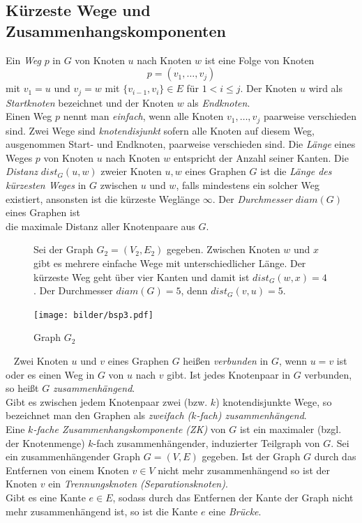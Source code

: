 \subsection{Kürzeste Wege und Zusammenhangskomponenten}
Ein \emph{Weg} $p$ in $G$ von Knoten $u$ nach Knoten $w$ ist eine Folge von Knoten $$p=(v_1,\ldots,v_j)$$ mit $v_1=u$ und $v_j=w$ mit $\{v_{i-1},v_i\}\in E$ für $1 <i \leq j$. Der Knoten $u$ wird als \emph{Startknoten} bezeichnet und der Knoten $w$ als \emph{Endknoten}.\\Einen Weg $p$ nennt man \emph{einfach}, wenn alle Knoten $v_1,\ldots,v_j$ paarweise verschieden sind. Zwei Wege sind \emph{knotendisjunkt} sofern alle Knoten auf diesem Weg, ausgenommen Start- und Endknoten, paarweise verschieden sind. Die \emph{Länge} eines Weges $p$ von Knoten $u$ nach Knoten $w$ entspricht der Anzahl seiner Kanten.\vspace{-1mm}\newline\newline
Die \emph{Distanz} $dist_G(u,w)$ zweier Knoten $u,w$ eines Graphen $G$ ist die \emph{Länge des kürzesten Weges} in $G$ zwischen $u$ und $w$, falls mindestens ein solcher Weg existiert, ansonsten ist die kürzeste Weglänge $\infty$. Der \emph{Durchmesser} $diam(G)$ eines Graphen ist\\die maximale Distanz aller Knotenpaare aus $G$.

\begin{figure}[h!]
\begin{minipage}{230pt}
Sei der Graph $G_2=(V_2,E_2)$ gegeben. Zwischen Knoten $w$ und $x$ gibt es mehrere einfache Wege mit unterschiedlicher Länge. Der kürzeste Weg geht über vier Kanten und damit ist $dist_G(w, x)=4$. Der Durchmesser $diam(G)=5$, denn $dist_G(v, u)=5$.
\end{minipage}
\begin{minipage}{220pt}
		\centering 		 
   \texttt{[image: bilder/bsp3.pdf]}
	\caption{Graph $G_2$}
\end{minipage}
  	 \end{figure}
  	 \vspace{-2mm}
  	 ~\linebreak
Zwei Knoten $u$ und $v$ eines Graphen $G$ heißen \emph{verbunden} in $G$, wenn $u = v$ ist oder es einen Weg in $G$ von $u$ nach $v$ gibt. Ist jedes Knotenpaar in $G$ verbunden, so heißt $G$ \emph{zusammenhängend}.\\Gibt es zwischen jedem Knotenpaar zwei (bzw. $k$) knotendisjunkte Wege, so bezeichnet man den Graphen als \emph{zweifach ($k$-fach) zusammenhängend}.\\Eine \emph{$k$-fache Zusammenhangskomponente (ZK)} von $G$ ist ein maximaler (bzgl. der Knotenmenge) $k$-fach zusammenhängender, induzierter Teilgraph von $G$.\newline\newline
Sei ein zusammenhängender Graph $G=(V,E)$ gegeben. Ist der Graph $G$ durch das Entfernen von einem Knoten $v \in V$ nicht mehr zusammenhängend so ist der Knoten $v$ ein \emph{Trennungsknoten (Separationsknoten)}.\\Gibt es eine Kante $e \in E$, sodass durch das Entfernen der Kante der Graph nicht mehr zusammenhängend ist, so ist die Kante $e$ eine \emph{Brücke}.

